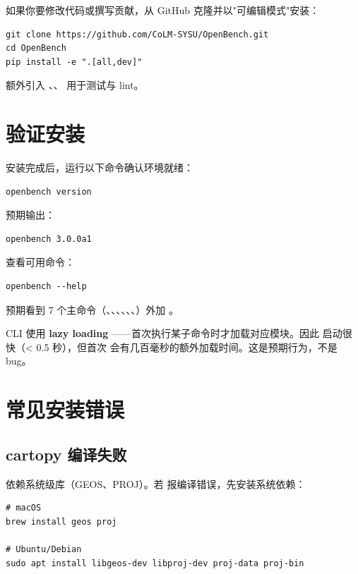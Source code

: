 如果你要修改代码或撰写贡献，从 GitHub 克隆并以"可编辑模式"安装：

\begin{verbatim}
git clone https://github.com/CoLM-SYSU/OpenBench.git
cd OpenBench
pip install -e ".[all,dev]"
\end{verbatim}

\cli{[dev]} 额外引入 、、 用于测试与 lint。

\section{验证安装}

安装完成后，运行以下命令确认环境就绪：

\begin{verbatim}
openbench version
\end{verbatim}

预期输出：

\begin{verbatim}
openbench 3.0.0a1
\end{verbatim}

查看可用命令：

\begin{verbatim}
openbench --help
\end{verbatim}

预期看到 7 个主命令（、、、、、、）外加 。

\begin{tipBox}
\openbench{} CLI 使用 \textbf{lazy loading} ——首次执行某子命令时才加载对应模块。因此  启动很快（< 0.5 秒），但首次  会有几百毫秒的额外加载时间。这是预期行为，不是 bug。
\end{tipBox}

\section{常见安装错误}

\subsection{cartopy 编译失败}

 依赖系统级库（GEOS、PROJ）。若  报编译错误，先安装系统依赖：

\begin{verbatim}
# macOS
brew install geos proj

# Ubuntu/Debian
sudo apt install libgeos-dev libproj-dev proj-data proj-bin
\end{verbatim}

